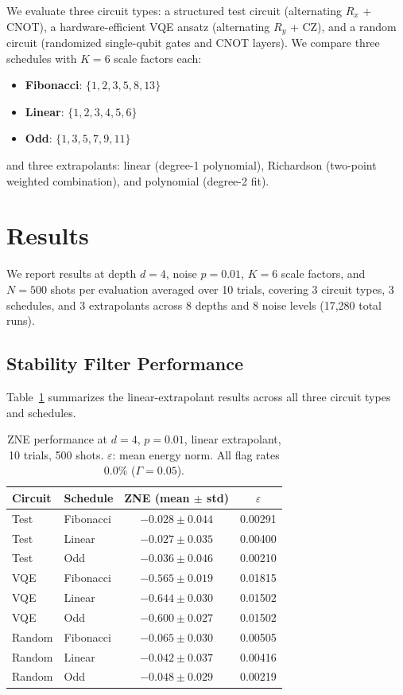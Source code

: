 \documentclass[twocolumn,showpacs,preprintnumbers,amsmath,amssymb,prl]{revtex4-2}
\begin{document}
We evaluate three circuit types: a structured test circuit
(alternating $R_x$ + CNOT), a hardware-efficient VQE ansatz
(alternating $R_y$ + CZ), and a random circuit (randomized
single-qubit gates and CNOT layers). We compare three schedules
with $K=6$ scale factors each:
\begin{itemize}
    \item \textbf{Fibonacci}: $\{1, 2, 3, 5, 8, 13\}$
    \item \textbf{Linear}: $\{1, 2, 3, 4, 5, 6\}$
    \item \textbf{Odd}: $\{1, 3, 5, 7, 9, 11\}$
\end{itemize}
and three extrapolants: linear (degree-1 polynomial), Richardson
(two-point weighted combination), and polynomial (degree-2 fit).

\section{Results}
\label{sec:results}

We report results at depth $d=4$, noise $p=0.01$, $K=6$ scale factors,
and $N=500$ shots per evaluation averaged over 10 trials, covering
3 circuit types, 3 schedules, and 3 extrapolants across 8 depths and
8 noise levels (17,280 total runs).

\subsection{Stability Filter Performance}

Table~\ref{tab:results} summarizes the linear-extrapolant results
across all three circuit types and schedules.

\begin{table}[!ht]
\centering
\caption{ZNE performance at $d=4$, $p=0.01$, linear extrapolant, 10 trials, 500 shots.
$\varepsilon$: mean energy norm. All flag rates 0.0\% ($\Gamma=0.05$).}
\label{tab:results}
\begin{tabular}{llcc}
\toprule
Circuit & Schedule & ZNE (mean $\pm$ std) & $\varepsilon$ \\
\midrule
Test   & Fibonacci & $-0.028 \pm 0.044$ & 0.00291 \\
Test   & Linear    & $-0.027 \pm 0.035$ & 0.00400 \\
Test   & Odd       & $-0.036 \pm 0.046$ & 0.00210 \\
\midrule
VQE    & Fibonacci & $-0.565 \pm 0.019$ & 0.01815 \\
VQE    & Linear    & $-0.644 \pm 0.030$ & 0.01502 \\
VQE    & Odd       & $-0.600 \pm 0.027$ & 0.01502 \\
\midrule
Random & Fibonacci & $-0.065 \pm 0.030$ & 0.00505 \\
Random & Linear    & $-0.042 \pm 0.037$ & 0.00416 \\
Random & Odd       & $-0.048 \pm 0.029$ & 0.00219 \\
\bottomrule
\end{tabular}
\end{table}
\end{document}
